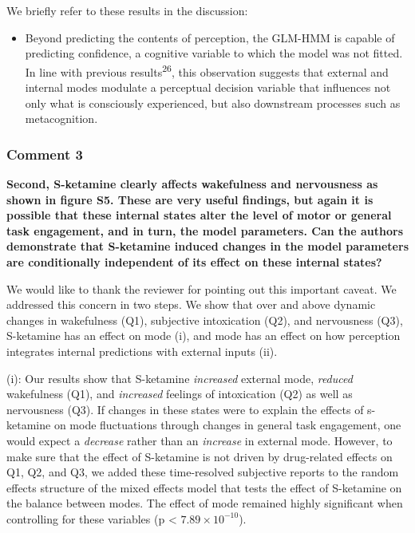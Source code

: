 \documentclass[
]{article}
\providecommand{\tightlist}{%
  \setlength{\itemsep}{0pt}\setlength{\parskip}{0pt}}
\begin{document}
We briefly refer to these results in the discussion:

\begin{itemize}
\tightlist
\item
  Beyond predicting the contents of perception, the GLM-HMM is capable
  of predicting confidence, a cognitive variable to which the model was
  not fitted. In line with previous results\textsuperscript{26}, this
  observation suggests that external and internal modes modulate a
  perceptual decision variable that influences not only what is
  consciously experienced, but also downstream processes such as
  metacognition.
\end{itemize}

\subsubsection{Comment 3}\label{comment-3-2}

\textbf{Second, S-ketamine clearly affects wakefulness and nervousness
as shown in figure S5. These are very useful findings, but again it is
possible that these internal states alter the level of motor or general
task engagement, and in turn, the model parameters. Can the authors
demonstrate that S-ketamine induced changes in the model parameters are
conditionally independent of its effect on these internal states?}

We would like to thank the reviewer for pointing out this important
caveat. We addressed this concern in two steps. We show that over and
above dynamic changes in wakefulness (Q1), subjective intoxication (Q2),
and nervousness (Q3), S-ketamine has an effect on mode (i), and mode has
an effect on how perception integrates internal predictions with
external inputs (ii).

(i): Our results show that S-ketamine \emph{increased} external mode,
\emph{reduced} wakefulness (Q1), and \emph{increased} feelings of
intoxication (Q2) as well as nervousness (Q3). If changes in these
states were to explain the effects of s-ketamine on mode fluctuations
through changes in general task engagement, one would expect a
\emph{decrease} rather than an \emph{increase} in external mode.
However, to make sure that the effect of S-ketamine is not driven by
drug-related effects on Q1, Q2, and Q3, we added these time-resolved
subjective reports to the random effects structure of the mixed effects
model that tests the effect of S-ketamine on the balance between modes.
The effect of mode remained highly significant when controlling for
these variables (p \textless{} \(\ensuremath{7.89\times 10^{-10}}\)).
\end{document}
